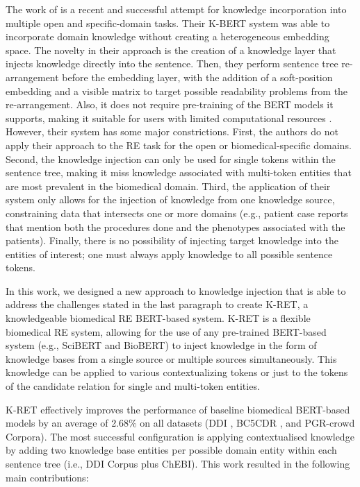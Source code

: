 The work of \cite{liu2020k} is a recent and successful attempt
 for knowledge incorporation into multiple open and specific-domain tasks. Their K-BERT system was able to incorporate domain knowledge without creating a heterogeneous embedding space. The novelty in their approach is the creation of a knowledge layer that injects knowledge directly into the sentence. Then, they perform sentence tree re-arrangement before the embedding layer, with the addition of a soft-position embedding and a visible matrix to target possible readability problems from the re-arrangement. Also, it does not require pre-training of the BERT models it supports, making it suitable for users with limited computational resources \citep{zhao2019uer}. However, their system has some major constrictions. First, the authors do not apply their approach to the RE task for the open or biomedical-specific domains. Second, the knowledge injection can only be used for single tokens within the sentence tree, making it miss knowledge associated with multi-token entities that are most prevalent in the biomedical domain. Third, the application of their system only allows for the injection of knowledge from one knowledge source, constraining data that intersects one or more domains (e.g., patient case reports that mention both the procedures done and the phenotypes associated with the patients). Finally, there is no possibility of injecting target knowledge into the entities of interest; one must always apply knowledge to all possible sentence tokens.   

In this work, we designed a new approach to knowledge injection that is able to address the challenges stated in the last paragraph to create K-RET, a knowledgeable biomedical RE BERT-based system. K-RET is a flexible biomedical RE system, allowing for the use of any pre-trained BERT-based system (e.g., SciBERT and BioBERT) to inject knowledge in the form of knowledge bases from a single source or multiple sources simultaneously. This knowledge can be applied to various contextualizing tokens or just to the tokens of the candidate relation for single and multi-token entities. 

K-RET effectively improves the performance of baseline biomedical BERT-based models by an average of 2.68\% on all datasets (DDI \citep{herrero2013ddi,segura2014lessons}, BC5CDR \citep{li2016biocreative}, and PGR-crowd \citep{sousa2019silver,sousa2020hybrid} Corpora). The most successful configuration is applying contextualised knowledge by adding two knowledge base entities per possible domain entity within each sentence tree (i.e., DDI Corpus plus ChEBI). This work resulted in the following main contributions:\vspace*{1pt}

